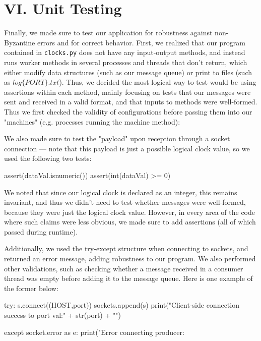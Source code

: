 \documentclass[
	a4paper, %
	10pt, %
	unnumberedsections, %
	twoside, %
]{LTJournalArticle}
\begin{document}
\section{VI. Unit Testing}
Finally, we made sure to test our application for robustness against non-Byzantine errors and for correct behavior. First, we realized that our program contained in \texttt{clocks.py} does not have any input-output methods, and instead runs worker methods in several processes and threads that don't return, which either modify data structures (such as our message queue) or print to files (such as $log\{PORT\}.txt$). Thus, we decided the most logical way to test would be using assertions within each method, mainly focusing on tests that our messages were sent and received in a valid format, and that inputs to methods were well-formed. Thus we first checked the validity of configurations before passing them into our "machines" (e.g. processes running the machine method):

We also made sure to test the "payload" upon reception through a socket connection --- note that this payload is just a possible logical clock value, so we used the following two tests:
\begin{python}
	assert(dataVal.isnumeric())
	assert(int(dataVal) >= 0)
\end{python}

We noted that since our logical clock is declared as an integer, this remains invariant, and thus we didn't need to test whether messages were well-formed, because they were just the logical clock value. However, in every area of the code where such claims were less obvious, we made sure to add assertions (all of which passed during runtime). 

Additionally, we used the try-except structure when connecting to sockets, and returned an error message, adding robustness to our program. We also performed other validations, such as checking whether a message received in a consumer thread was empty before adding it to the message queue. 
\newpage Here is one example of the former below:
\begin{python}
try:
	s.connect((HOST,port))
	sockets.append(s)
	print("Client-side connection success 
			to port val:" + str(port) + "\n")

except socket.error as e:
	print("Error connecting producer: %
\end{python}
\end{document}
